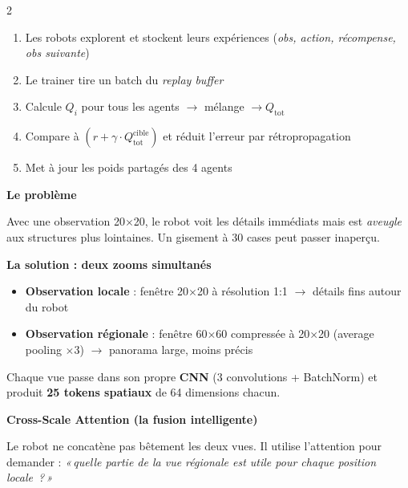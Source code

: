 \documentclass[a4paper,landscape]{article}
\begin{document}
\begin{multicols}{2}
\begin{tcolorbox}[colback=colServer!6,colframe=colServer,
    fonttitle=\bfseries\normalsize,title=Partie 1 — QMIX expliqué simplement,
    arc=5pt,boxrule=1.3pt]
\begin{enumerate}[leftmargin=1.5em,itemsep=2pt]
    \item Les robots explorent et stockent leurs expériences
          (\textit{obs, action, récompense, obs suivante})
    \item Le trainer tire un batch du \textit{replay buffer}
    \item Calcule \(Q_i\) pour tous les agents \(\to\) mélange \(\to Q_{\text{tot}}\)
    \item Compare à \((r + \gamma \cdot Q_{\text{tot}}^{\text{cible}})\)
          et réduit l'erreur par rétropropagation
    \item Met à jour les poids partagés des 4 agents
\end{enumerate}

\end{tcolorbox}

\columnbreak

\begin{tcolorbox}[colback=colAgent!6,colframe=colAgent,
    fonttitle=\bfseries\normalsize,
    title=Partie 2 — Contribution 1 : Multi-Scale CNN Encoder,
    arc=5pt,boxrule=1.3pt]

\textbf{Le problème}

Avec une observation 20\(\times\)20, le robot voit les détails immédiats
mais est \textit{aveugle} aux structures plus lointaines.
Un gisement à 30 cases peut passer inaperçu.

\medskip
\textbf{La solution : deux zooms simultanés}

\begin{itemize}[leftmargin=1.2em,itemsep=2pt]
    \item \textbf{Observation locale} : fenêtre 20\(\times\)20 à résolution 1:1
          \(\to\) détails fins autour du robot
    \item \textbf{Observation régionale} : fenêtre 60\(\times\)60 compressée
          à 20\(\times\)20 (average pooling \(\times3\))
          \(\to\) panorama large, moins précis
\end{itemize}

Chaque vue passe dans son propre \textbf{CNN} (3 convolutions + BatchNorm)
et produit \textbf{25 tokens spatiaux} de 64 dimensions chacun.

\medskip
\textbf{Cross-Scale Attention (la fusion intelligente)}

Le robot ne concatène pas bêtement les deux vues.
Il utilise l'attention pour demander : \textit{«\,quelle partie de
la vue régionale est utile pour chaque position locale~?\,»}


\end{tcolorbox}
\end{multicols}
\end{document}
